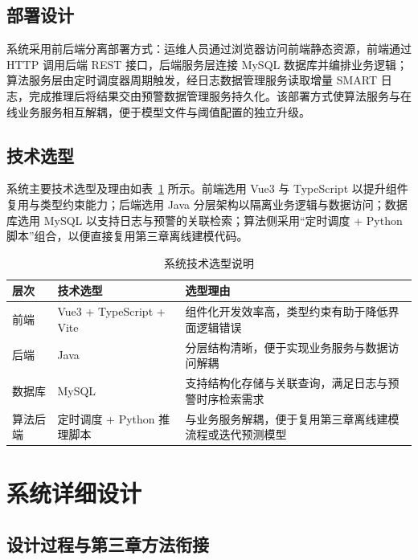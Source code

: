 \subsection{部署设计}

系统采用前后端分离部署方式：运维人员通过浏览器访问前端静态资源，前端通过 HTTP 调用后端 REST 接口，后端服务层连接 MySQL 数据库并编排业务逻辑；算法服务层由定时调度器周期触发，经日志数据管理服务读取增量 SMART 日志，完成推理后将结果交由预警数据管理服务持久化。该部署方式使算法服务与在线业务服务相互解耦，便于模型文件与阈值配置的独立升级。
\label{sec:sw-deploy}

\subsection{技术选型}

系统主要技术选型及理由如表~\ref{tab:sw-tech} 所示。前端选用 Vue3 与 TypeScript 以提升组件复用与类型约束能力；后端选用 Java 分层架构以隔离业务逻辑与数据访问；数据库选用 MySQL 以支持日志与预警的关联检索；算法侧采用“定时调度 + Python 脚本”组合，以便直接复用第三章离线建模代码。

\begin{table}[htbp]
    \centering
    \caption{\label{tab:sw-tech}系统技术选型说明}
    \begin{tabularx}{0.96\linewidth}{>{\centering\arraybackslash}m{2.4cm} >{\raggedright\arraybackslash}m{3.8cm} >{\raggedright\arraybackslash}X}
        \toprule
        层次 & 技术选型 & 选型理由 \\
        \midrule
        前端 & Vue3 + TypeScript + Vite & 组件化开发效率高，类型约束有助于降低界面逻辑错误 \\
        后端 & Java & 分层结构清晰，便于实现业务服务与数据访问解耦 \\
        数据库 & MySQL & 支持结构化存储与关联查询，满足日志与预警时序检索需求 \\
        算法后端 & 定时调度 + Python 推理脚本 & 与业务服务解耦，便于复用第三章离线建模流程或迭代预测模型 \\
        \bottomrule
    \end{tabularx}
\end{table}

\section{系统详细设计}

\subsection{设计过程与第三章方法衔接}

